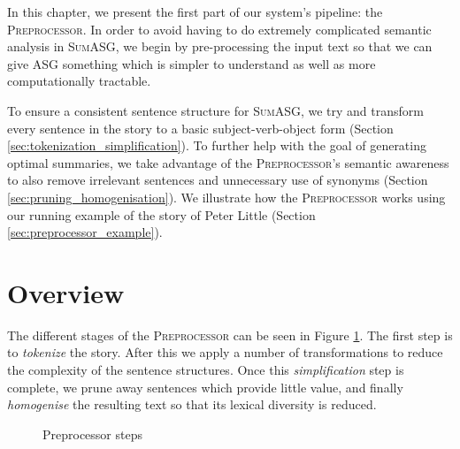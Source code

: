 \label{chapter:preprocessor}

In this chapter, we present the first part of our system's pipeline: the \textsc{Preprocessor}. In order to avoid having to do extremely complicated semantic analysis in \textsc{SumASG}, we begin by pre-processing the input text so that we can give ASG something which is simpler to understand as well as more computationally tractable.

To ensure a consistent sentence structure for \textsc{SumASG}, we try and transform every sentence in the story to a basic subject-verb-object form (Section \ref{sec:tokenization_simplification}). To further help with the goal of generating optimal summaries, we take advantage of the \textsc{Preprocessor}'s semantic awareness to also remove irrelevant sentences and unnecessary use of synonyms (Section \ref{sec:pruning_homogenisation}). We illustrate how the \textsc{Preprocessor} works using our running example of the story of Peter Little (Section \ref{sec:preprocessor_example}).

\section{Overview}

The different stages of the \textsc{Preprocessor} can be seen in Figure \ref{fig:preprocessor_pipeline}. The first step is to \textit{tokenize} the story. After this we apply a number of transformations to reduce the complexity of the sentence structures. Once this \textit{simplification} step is complete, we prune away sentences which provide little value, and finally \textit{homogenise} the resulting text so that its lexical diversity is reduced.

{
\begin{figure}[H]
\centering
{}
\caption{Preprocessor steps}
\label{fig:preprocessor_pipeline}
\end{figure}
}

